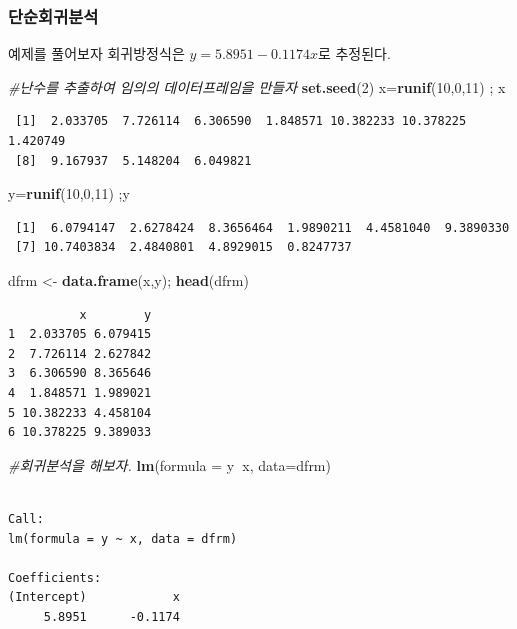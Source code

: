 \documentclass[]{article}
\newenvironment{Shaded}{\begin{snugshade}}{\end{snugshade}}
\newcommand{\KeywordTok}[1]{\textcolor[rgb]{0.13,0.29,0.53}{\textbf{#1}}}
\newcommand{\DataTypeTok}[1]{\textcolor[rgb]{0.13,0.29,0.53}{#1}}
\newcommand{\DecValTok}[1]{\textcolor[rgb]{0.00,0.00,0.81}{#1}}
\newcommand{\StringTok}[1]{\textcolor[rgb]{0.31,0.60,0.02}{#1}}
\newcommand{\CommentTok}[1]{\textcolor[rgb]{0.56,0.35,0.01}{\textit{#1}}}
\newcommand{\OperatorTok}[1]{\textcolor[rgb]{0.81,0.36,0.00}{\textbf{#1}}}
\newcommand{\NormalTok}[1]{#1}
\begin{document}
\subsubsection{단순회귀분석}

예제를 풀어보자 회귀방정식은 \(y= 5.8951 -0.1174x\)로 추정된다.

\begin{Shaded}
\begin{Highlighting}[]
\CommentTok{#난수를 추출하여 임의의 데이터프레임을 만들자}
\KeywordTok{set.seed}\NormalTok{(}\DecValTok{2}\NormalTok{)}
\NormalTok{x=}\KeywordTok{runif}\NormalTok{(}\DecValTok{10}\NormalTok{,}\DecValTok{0}\NormalTok{,}\DecValTok{11}\NormalTok{) ; x}
\end{Highlighting}
\end{Shaded}

\begin{verbatim}
 [1]  2.033705  7.726114  6.306590  1.848571 10.382233 10.378225  1.420749
 [8]  9.167937  5.148204  6.049821
\end{verbatim}

\begin{Shaded}
\begin{Highlighting}[]
\NormalTok{y=}\KeywordTok{runif}\NormalTok{(}\DecValTok{10}\NormalTok{,}\DecValTok{0}\NormalTok{,}\DecValTok{11}\NormalTok{) ;y}
\end{Highlighting}
\end{Shaded}

\begin{verbatim}
 [1]  6.0794147  2.6278424  8.3656464  1.9890211  4.4581040  9.3890330
 [7] 10.7403834  2.4840801  4.8929015  0.8247737
\end{verbatim}

\begin{Shaded}
\begin{Highlighting}[]
\NormalTok{dfrm <-}\StringTok{ }\KeywordTok{data.frame}\NormalTok{(x,y); }\KeywordTok{head}\NormalTok{(dfrm)}
\end{Highlighting}
\end{Shaded}

\begin{verbatim}
          x        y
1  2.033705 6.079415
2  7.726114 2.627842
3  6.306590 8.365646
4  1.848571 1.989021
5 10.382233 4.458104
6 10.378225 9.389033
\end{verbatim}

\begin{Shaded}
\begin{Highlighting}[]
\CommentTok{#회귀분석을 해보자. }
\KeywordTok{lm}\NormalTok{(}\DataTypeTok{formula =}\NormalTok{ y}\OperatorTok{~}\NormalTok{x, }\DataTypeTok{data=}\NormalTok{dfrm) }
\end{Highlighting}
\end{Shaded}

\begin{verbatim}

Call:
lm(formula = y ~ x, data = dfrm)

Coefficients:
(Intercept)            x  
     5.8951      -0.1174  
\end{verbatim}
\end{document}
